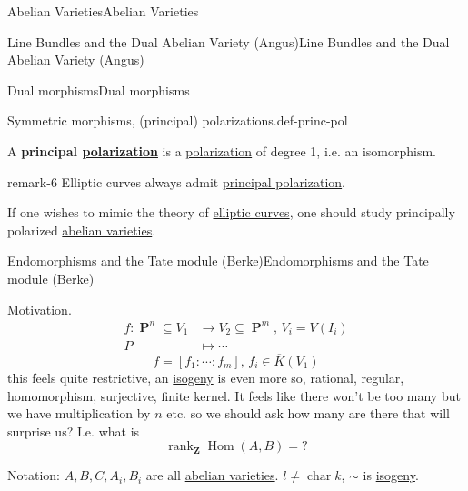 \documentclass[10pt,]{book}
\newcommand{\terminology}[1]{\textbf{#1}}
\numberwithin{equation}{section}
\newcommand{\lb}{[}
\newcommand{\rb}{]}
\newcommand{\ZZ}{\mathbf{Z}}
\DeclareMathOperator{\Hom}{Hom}
\DeclareMathOperator{\rank}{rank}
\DeclareMathOperator{\characteristic}{char}
\DeclareMathOperator{\PP}{\mathbf{P}}
\newcommand{\amp}{&}
\begin{document}
\begin{chapterptx}{Abelian Varieties}{}{Abelian Varieties}{}{}
\begin{sectionptx}{Line Bundles and the Dual Abelian Variety (Angus)}{}{Line Bundles and the Dual Abelian Variety (Angus)}{}{}
\begin{subsectionptx}{Dual morphisms}{}{Dual morphisms}{}{}
\begin{definition}{Symmetric morphisms, (principal) polarizations.}{def-princ-pol}
\par
\hypertarget{p-204}{}%
A \terminology{principal \hyperref[def-polarization]{polarization}} is a \hyperref[def-polarization]{polarization} of degree 1, i.e. an isomorphism.%
\end{definition}
\begin{remark}{}{remark-6}%
\hypertarget{p-205}{}%
Elliptic curves always admit \hyperref[def-polarization]{principal polarization}.%
\par
\hypertarget{p-206}{}%
If one wishes to mimic the theory of \hyperref[def-supersing-isog-ec]{elliptic curves}, one should study principally polarized \hyperref[def-buntes-abvar]{abelian varieties}.%
\end{remark}
\end{subsectionptx}
\end{sectionptx}
%
%
\typeout{************************************************}
\typeout{************************************************}
%
\begin{sectionptx}{Endomorphisms and the Tate module (Berke)}{}{Endomorphisms and the Tate module (Berke)}{}{}\label{sec-endomorphisms}
\begin{introduction}{Motivation.}%
\hypertarget{p-207}{}%
%
\begin{align*}
f \colon \PP^n\subseteq V_1 \amp\to V_2 \subseteq \PP^m,\,V_i = V(I_i)\\
P\amp \mapsto \cdots
\end{align*}
%
\begin{equation*}
f = \lb f_1 : \cdots : f_m\rb ,\,f_i\in \overline K (V_1)
\end{equation*}
this feels quite restrictive, an \hyperref[def-supersing-isog-isog]{isogeny} is even more so, rational, regular, homomorphism, surjective, finite kernel. It feels like there won't be too many but we have multiplication by \(n\) etc. so we should ask how many are there that will surprise us? I.e. what is%
\begin{equation*}
\rank_\ZZ \Hom(A,B) = ?
\end{equation*}
%
\par
\hypertarget{p-208}{}%
Notation: \(A,B,C , A_i,  B_i\) are all \hyperref[def-buntes-abvar]{abelian varieties}. \(l \ne \characteristic k\), \(\sim\) is \hyperref[def-supersing-isog-isog]{isogeny}.%
\end{introduction}%
%
%
\typeout{************************************************}

\end{sectionptx}
\end{chapterptx}
\end{document}
